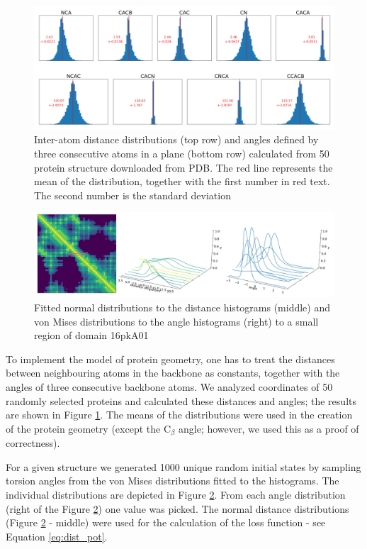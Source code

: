 \begin{figure}
    \centering
    \includegraphics[width=\linewidth]{imgs_tomas/inter_data.png}
    \caption{Inter-atom distance distributions (top row) and angles defined by three consecutive atoms in a plane (bottom row) calculated from 50 protein structure downloaded from PDB. The red line represents the mean of the distribution, together with the first number in red text. The second number is the standard deviation}
    \label{fig:interresidue}
\end{figure}

\begin{figure}
    \centering
    \includegraphics[width=\linewidth]{imgs_tomas/histograms2.png}
    \caption{Fitted normal distributions to the distance histograms (middle) and von Mises distributions to the angle histograms (right) to a small region of domain 16pkA01}
    \label{fig:distributions}
\end{figure}

To implement the model of protein geometry, one has to treat the distances between neighbouring atoms in the backbone as constants, together with the angles of three consecutive backbone atoms. We analyzed coordinates of 50 randomly selected proteins and calculated these distances and angles; the results are shown in Figure \ref{fig:interresidue}. The means of the distributions were used in the creation of the protein geometry (except the C$_\beta$ angle; however, we used this as a proof of correctness).

For a given structure we generated 1000 unique random initial states by sampling torsion angles from the von Mises distributions fitted to the histograms. The individual distributions are depicted in Figure \ref{fig:distributions}. From each angle distribution (right of the Figure \ref{fig:distributions}) one value was picked. The normal distance distributions (Figure \ref{fig:distributions} - middle) were used for the calculation of the loss function - see Equation \ref{eq:dist_pot}.

